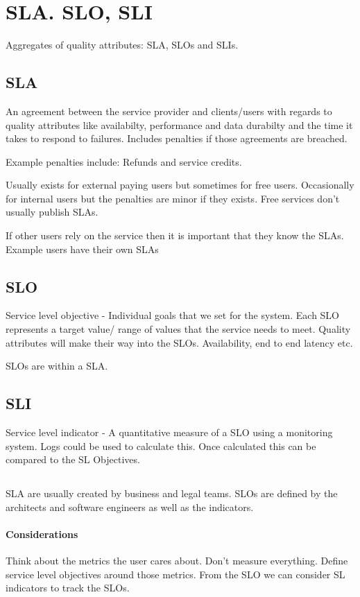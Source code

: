 \documentclass[a4paper, 11pt]{book}
\begin{document}
    \section{SLA. SLO, SLI}
    Aggregates of quality attributes: SLA, SLOs and SLIs.

    \subsection{SLA}
    An agreement between the service provider and clients/users with regards to quality attributes like availabilty, performance and data durabilty and the time it takes to respond to failures.
    Includes penalties if those agreements are breached.

    Example penalties include: Refunds and service credits.

    Usually exists for external paying users but sometimes for free users.
    Occasionally for internal users but the penalties are minor if they exists.
    Free services don't usually publish SLAs.

    If other users rely on the service then it is important that they know the SLAs.
    Example users have their own SLAs

    \subsection{SLO}
    Service level objective - Individual goals that we set for the system.
    Each SLO represents a target value/ range of values that the service needs to meet.
    Quality attributes will make their way into the SLOs. Availability, end to end latency etc.

    SLOs are within a SLA.

    \subsection{SLI}
    Service level indicator - A quantitative measure of a SLO using a monitoring system. Logs could be used to calculate this.
    Once calculated this can be compared to the SL Objectives.

    \subsection{}
    SLA are usually created by business and legal teams.
    SLOs are defined by the architects and software engineers as well as the indicators.

    \paragraph{Considerations}
    Think about the metrics the user cares about.
    Don't measure everything.
    Define service level objectives around those metrics.
    From the SLO we can consider SL indicators to track the SLOs.
\end{document}

